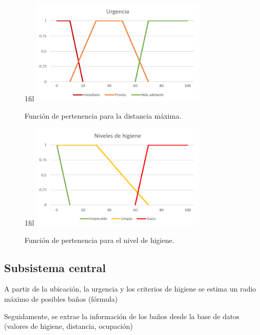 \documentclass[13pt,a4paper]{article}
\makeatletter
\newcommand*{\centerfloat}{%
  \parindent \z@
  \leftskip \z@ \@plus 1fil \@minus \textwidth
  \rightskip\leftskip
  \parfillskip \z@skip}
\makeatother
\begin{document}
\begin{figure}[H]
  \centerfloat
  \includegraphics[width=0.75\textwidth]{img/1.png}
  \caption{Función de pertenencia para la distancia máxima.}
  \label{distancia}
\end{figure}

\begin{figure}[H]
  \centerfloat
  \includegraphics[width=0.75\textwidth]{img/3.png}
  \caption{Función de pertenencia para el nivel de higiene.}
  \label{higiene}
\end{figure}

\subsection{Subsistema central}


A partir de la ubicación, la urgencia y los criterios de higiene se estima un radio máximo de posibles baños (fórmula)

Seguidamente, se extrae la información de los baños desde la base de datos (valores de higiene, distancia, ocupación) 

\end{document}
